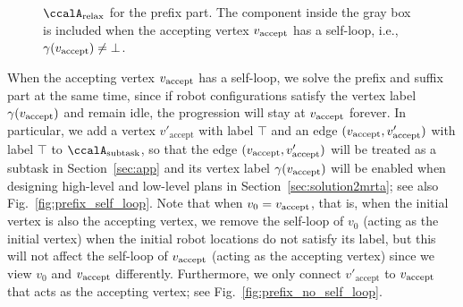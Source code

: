 \documentclass[Afour,sageh,times]{sagej}
\newcommand{\auto}[1]{\ccalA_{\textup{#1}}}
\newcommand{\vertex}[1]{v_{\textup{#1}}}
\newcommand{\domanda}[1]{\subsubsection*{#1}}
\begin{document}
\begin{figure}
  \centering
  \hspace{0.2em}
  \subfigure[$v_0= \vertex{accept}$ and $\gamma(v_0)$ is not satisfied by  initial robot locations]{
    \texttt{[image: prefix\_no\_self\_loop.pdf]}\label{fig:prefix_no_self_loop}}
  \caption{$\auto{relax}$ for the prefix part. The component inside the gray box is included when the accepting vertex $\vertex{accept}$ has a self-loop, i.e., $\gamma(\vertex{accept})\neq \bot$.}\label{fig:prefix}
\end{figure}

When the accepting vertex $\vertex{accept}$ has a self-loop, we solve the prefix and suffix part at the same time, since if robot configurations satisfy the vertex label $\gamma(\vertex{accept})$ and remain idle, the progression will stay at $\vertex{accept}$ forever.
In particular, we add a vertex $v'_{\text{accept}}$ with label $\top$ and an edge $(\vertex{accept}, v'_{\text{accept}})$ with label $\top$ to $\auto{subtask}$, so that the edge $(\vertex{accept}, v'_{\text{accept}})$ will be treated as a subtask in Section~\ref{sec:app} and its vertex label $\gamma(\vertex{accept})$ will be enabled when designing high-level and low-level plans in Section~\ref{sec:solution2mrta}; see also Fig.~\ref{fig:prefix_self_loop}.  Note that when $v_0 = \vertex{accept}$, that is, when the initial vertex is also the accepting vertex, we remove the self-loop of $v_0$ (acting as the initial vertex) when the initial robot locations do not satisfy its label, but this will not affect the self-loop of $\vertex{accept}$ (acting as the accepting vertex) since  we view $v_0$ and $\vertex{accept}$ differently. Furthermore, we only connect $v'_{\text{accept}}$ to $\vertex{accept}$ that acts as the accepting vertex; see Fig.~\ref{fig:prefix_no_self_loop}.
\end{document}
